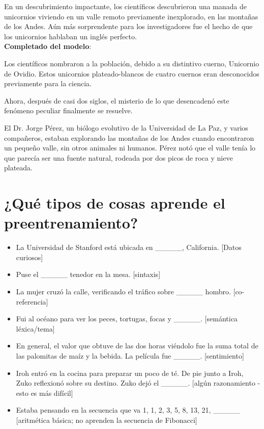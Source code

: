 En un descubrimiento impactante, los científicos descubrieron una manada de unicornios viviendo en un valle remoto previamente inexplorado, en las montañas de los Andes. Aún más sorprendente para los investigadores fue el hecho de que los unicornios hablaban un inglés perfecto. \\
\textbf{Completado del modelo}:

Los científicos nombraron a la población, debido a su distintivo cuerno, Unicornio de Ovidio. Estos unicornios plateado-blancos de cuatro cuernos eran desconocidos previamente para la ciencia.

Ahora, después de casi dos siglos, el misterio de lo que desencadenó este fenómeno peculiar finalmente se resuelve.

El Dr. Jorge Pérez, un biólogo evolutivo de la Universidad de La Paz, y varios compañeros, estaban explorando las montañas de los Andes cuando encontraron un pequeño valle, sin otros animales ni humanos. Pérez notó que el valle tenía lo que parecía ser una fuente natural, rodeada por dos picos de roca y nieve plateada.


\section{¿Qué tipos de cosas aprende el preentrenamiento?}

\begin{itemize}
\item La Universidad de Stanford está ubicada en \_\_\_\_\_, California. [Datos curiosos]
\item Puse el \_\_\_\_\_ tenedor en la mesa. [sintaxis]
\item La mujer cruzó la calle, verificando el tráfico sobre \_\_\_\_\_ hombro. [co-referencia]
 \item Fui al océano para ver los peces, tortugas, focas y \_\_\_\_\_. [semántica léxica/tema]
\item En general, el valor que obtuve de las dos horas viéndolo fue la suma total de las palomitas de maíz y la bebida. La película fue \_\_\_\_\_. [sentimiento]
\item Iroh entró en la cocina para preparar un poco de té. De pie junto a Iroh, Zuko reflexionó sobre su destino. Zuko dejó el \_\_\_\_\_. [algún razonamiento - esto es más difícil]
\item Estaba pensando en la secuencia que va 1, 1, 2, 3, 5, 8, 13, 21, \_\_\_\_\_ [aritmética básica; no aprenden la secuencia de Fibonacci]
\end{itemize}


